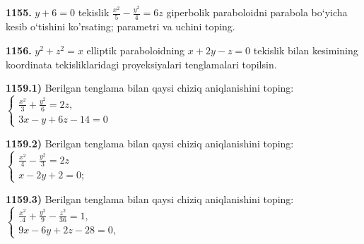 \textbf{1155.} $y+6=0$ tekislik $\frac{x^2}{5}-\frac{y^2}{4}=6 z$ giperbolik paraboloidni parabola bo‘yicha kesib o‘tishini ko'rsating; parametri va uchini toping.

\textbf{1156.} $y^2+z^2=x$ elliptik paraboloidning $x+2 y-z=0$ tekislik bilan kesimining koordinata tekisliklaridagi proyeksiyalari tenglamalari topilsin.

\textbf{1159.1)} Berilgan tenglama bilan qaysi chiziq aniqlanishini toping: $\left\{\begin{array}{l}\frac{x^2}{3}+\frac{y^2}{6}=2 z, \\ 3 x-y+6 z-14=0\end{array}\right.$

\textbf{1159.2)} Berilgan tenglama bilan qaysi chiziq aniqlanishini toping: $\left\{\begin{array}{l}\frac{x^2}{4}-\frac{y^2}{3}=2 z \\ x-2 y+2=0 ;\end{array}\right.$

\textbf{1159.3)} Berilgan tenglama bilan qaysi chiziq aniqlanishini toping: $\left\{\begin{array}{l}\frac{x^2}{.4}+\frac{y^2}{9}-\frac{z^2}{36}=1, \\ 9 x-6 y+2 z-28=0,\end{array}\right.$